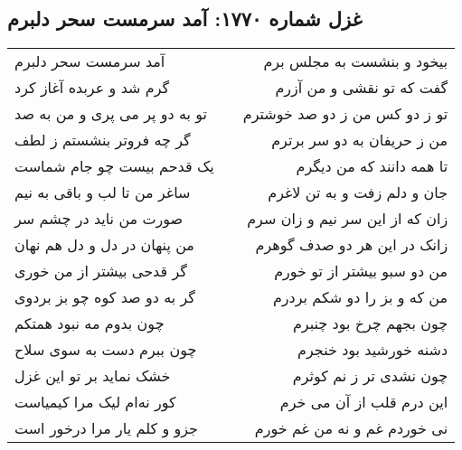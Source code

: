 \begin{center}
\section*{غزل شماره ۱۷۷۰: آمد سرمست سحر دلبرم}
\label{sec:1770}
\begin{longtable}{l p{0.5cm} r}
آمد سرمست سحر دلبرم
&&
بیخود و بنشست به مجلس برم
\\
گرم شد و عربده آغاز کرد
&&
گفت که تو نقشی و من آزرم
\\
تو به دو پر می پری و من به صد
&&
تو ز دو کس من ز دو صد خوشترم
\\
گر چه فروتر بنشستم ز لطف
&&
من ز حریفان به دو سر برترم
\\
یک قدحم بیست چو جام شماست
&&
تا همه دانند که من دیگرم
\\
ساغر من تا لب و باقی به نیم
&&
جان و دلم زفت و به تن لاغرم
\\
صورت من ناید در چشم سر
&&
زان که از این سر نیم و زان سرم
\\
من پنهان در دل و دل هم نهان
&&
زانک در این هر دو صدف گوهرم
\\
گر قدحی بیشتر از من خوری
&&
من دو سبو بیشتر از تو خورم
\\
گر به دو صد کوه چو بز بردوی
&&
من که و بز را دو شکم بردرم
\\
چون بدوم مه نبود همتکم
&&
چون بجهم چرخ بود چنبرم
\\
چون ببرم دست به سوی سلاح
&&
دشنه خورشید بود خنجرم
\\
خشک نماید بر تو این غزل
&&
چون نشدی تر ز نم کوثرم
\\
کور نه‌ام لیک مرا کیمیاست
&&
این درم قلب از آن می خرم
\\
جزو و کلم یار مرا درخور است
&&
نی خوردم غم و نه من غم خورم
\\
\end{longtable}
\end{center}
